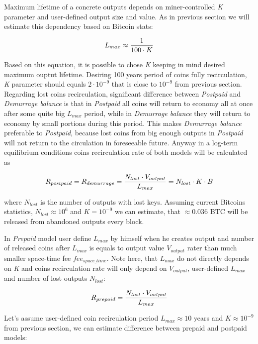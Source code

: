 \documentclass[]{article}   %
\begin{document}
Maximum lifetime of a concrete outputs depends on miner-controlled \textit{K} parameter and user-defined output size and value. As in previous section we will estimate this dependency based on Bitcoin stats:

\begin{equation}
{L_{max} \approx {1 \over 100 \cdot K}}
\end{equation}

Based on this equation, it is possible to chose \textit{K} keeping in mind desired maximum ouptut lifetime. Desiring 100 years period of coins fully recirculation, \textit{K} parameter should equals $2 \cdot 10^{-9}$ that is close to $10^{-9}$ from previous section. Regarding lost coins recirculation, significant difference between \textit{Postpaid} and \textit{Demurrage balance} is that in \textit{Postpaid} all coins will return to economy all at once after some quite big $L_{max}$ period, while in \textit{Demurrage balance} they will return to economy by small portions during this period. This makes \textit{Demurrage balance} preferable to \textit{Postpaid}, because lost coins from big enough outputs in \textit{Postpaid} will not return to the circulation in foreseeable future. Anyway in a log-term equilibrium conditions coins recirculation rate of both models will be calculated as

\begin{equation}
R_{postpaid} = R_{demurrage} = {N_{lost} \cdot V_{output} \over L_{max}} = {N_{lost} \cdot K \cdot B}
\end{equation}

where $N_{lost}$ is the number of outputs with lost keys. Assuming current Bitcoins statistics, $N_{lost}\approx10^6$ and $K = 10^{-9}$ we can estimate, that $\approx0.036$ BTC will be released from abandoned outputs every block.

In \textit{Prepaid} model user define $L_{max}$ by himself when he creates output and number of released coins after $L_{max}$ is equals to output value $V_{output}$ rater than much smaller space-time fee $fee_{space\_time}$. Note here, that $L_{max}$ do not directly depends on \textit{K} and coins recirculation rate will only depend on $V_{output}$, user-defined $L_{max}$ and number of lost outputs $N_{lost}$:

\begin{equation}
R_{prepaid} = {N_{lost} \cdot V_{output} \over L_{max}}
\end{equation}

Let's assume user-defined coin recirculation period $L_{max}\approx10$ years and $K\approx10^{-9}$ from previous section, we can estimate difference between prepaid and postpaid models:
\end{document}
